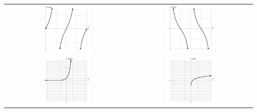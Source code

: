 \begin{center}
\begin{longtable}{cc}
    \includegraphics[width=0.4\textwidth]{tan}&
    \includegraphics[width=0.4\textwidth]{cot}\\
    \includegraphics[width=0.4\textwidth]{exp}&
    \includegraphics[width=0.4\textwidth]{ln}\\
  \end{longtable}
\end{center}


